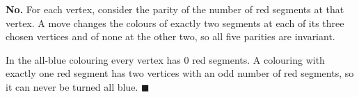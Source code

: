 \textbf{No.} For each vertex, consider the parity of the number of red segments at that vertex. A move changes the colours of exactly two segments at each of its three chosen vertices and of none at the other two, so all five parities are invariant.

In the all-blue colouring every vertex has $0$ red segments. A colouring with exactly one red segment has two vertices with an odd number of red segments, so it can never be turned all blue. $\blacksquare$
